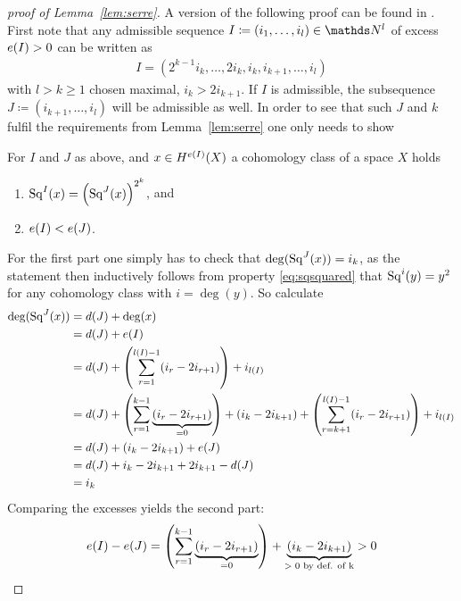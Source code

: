 \begin{proof}[proof of Lemma~\ref{lem:serre}]
  A version of the following proof can be found in
  \cite[p.~159, Lemma~1, converse part]{serre}.
  First note that any admissible sequence $I\coloneqq(i_1,\dotsc,i_l)\in\Nat^l$
  of excess $e(I)>0$ can be written as
  \begin{gather*}
    I=(2^{k-1}i_k,\dotsc,2i_k,i_k,i_{k+1},\dotsc,i_l)
  \end{gather*}
  with $l>k\geq 1$ chosen maximal, \idest $i_k>2i_{k+1}$. If $I$ is admissible, the subsequence
  $J\coloneqq(i_{k+1},\dotsc,i_l)$ will be admissible as well.
  In order to see that such $J$ and $k$ fulfil the requirements from
  Lemma~\ref{lem:serre} one only needs to show
  \begin{claim}
    For $I$ and $J$ as above, and $x\in H^{e(I)}(X)$ a cohomology
    class of a space $X$ holds
    \begin{enumerate}
    \item $\mathrm{Sq}^{I}(x) = \left(\mathrm{Sq}^{J}(x)\right)^{2^k}$, and
    \item $e(I)<e(J)$.
    \end{enumerate}
  \end{claim}
  For the first part one simply has to check that
  $\deg(\mathrm{Sq}^{J}(x))=i_k$, as the statement then inductively follows from
  property \eqref{eq:sqsquared} that $\mathrm{Sq}^{i}(y)=y^2$ for any cohomology
  class with $i=\deg(y)$.
  So calculate
  \begin{align*}
    \deg(\mathrm{Sq}^{J}(x))
    &= d(J) + \deg(x)\\
    &= d(J) + e(I)\\
    &= d(J) 
      + \left(\sum_{r=1}^{l(I)-1}(i_r-2i_{r+1})\right)
      + i_{l(I)}\\
    &= d(J)
      + \left(\sum_{r=1}^{k-1}\underbrace{(i_r-2i_{r+1})}_{=0}\right)
      + (i_k-2i_{k+1})
      +\left(\sum_{r=k+1}^{l(I)-1}(i_r-2i_{r+1})\right) + i_{l(I)}\\
    &= d(J)
      + (i_k-2i_{k+1})
      + e(J) \\
    &= d(J) + i_k - 2i_{k+1} + 2i_{k+1} - d(J) \\
    &= i_k
  \end{align*}
  Comparing the excesses yields the second part:
  \begin{gather*}
    e(I) - e(J)
    = \left(\sum_{r=1}^{k-1}\underbrace{(i_r-2i_{r+1})}_{=0}\right)
    + \underbrace{(i_k - 2i_{k+1})}_{\text{$>0$ by def. of k}}
    > 0
    \qedhere
  \end{gather*}
\end{proof}


